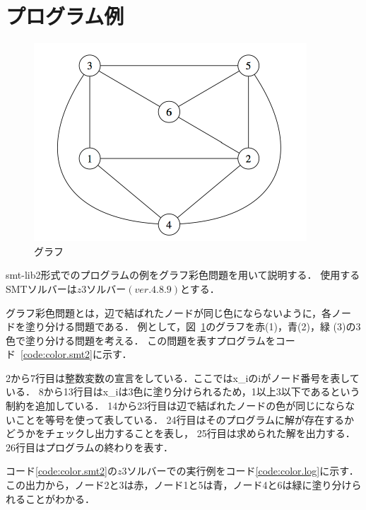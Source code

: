 \section{プログラム例}


%
%
\begin{figure}[tb]
  \centering
  \includegraphics[width=0.6\linewidth]{fig/graph3.pdf}
  \caption{グラフ}
  \label{fig:graph}
\end{figure}
smt-lib2形式でのプログラムの例をグラフ彩色問題を用いて説明する．
使用するSMTソルバーは$z3ソルバー(ver.4.8.9)$とする．

グラフ彩色問題とは，辺で結ばれたノードが同じ色にならないように，各ノー
ドを塗り分ける問題である．
例として，図~\ref{fig:graph}のグラフを赤(1)，青(2)，緑
(3)の3色で塗り分ける問題を考える．
この問題を表すプログラムをコード~\ref{code:color.smt2}に示す．

2から7行目は整数変数の宣言をしている．ここではx\_iのiがノード番号を表している．
8から13行目はx\_iは3色に塗り分けられるため，1以上3以下であるという制約を追加している．
14から23行目は辺で結ばれたノードの色が同じにならないことを等号を使って表している．
24行目はそのプログラムに解が存在するかどうかをチェックし出力することを表し，
25行目は求められた解を出力する．
26行目はプログラムの終わりを表す．

コード\ref{code:color.smt2}の$z3ソルバー$での実行例をコード\ref{code:color.log}に示す．
この出力から，ノード2と3は赤，ノード1と5は青，ノード4と6は緑に塗り分けられることがわかる．






